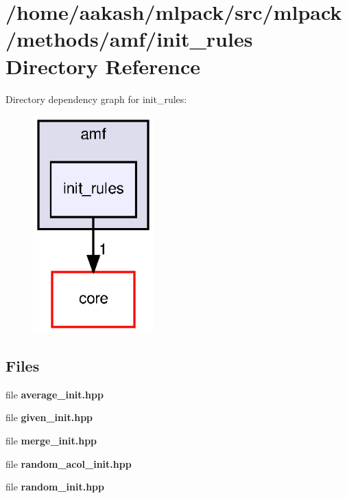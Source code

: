 \section{/home/aakash/mlpack/src/mlpack/methods/amf/init\+\_\+rules Directory Reference}
\label{dir_874bc73a472bc56857d75119e41021a1}
Directory dependency graph for init\+\_\+rules\+:
\nopagebreak
\begin{figure}[H]
\begin{center}
\leavevmode
\includegraphics[width=132pt]{dir_874bc73a472bc56857d75119e41021a1_dep}
\end{center}
\end{figure}
\subsection*{Files}
\begin{DoxyCompactItemize}
\item 
file \textbf{ average\+\_\+init.\+hpp}
\item 
file \textbf{ given\+\_\+init.\+hpp}
\item 
file \textbf{ merge\+\_\+init.\+hpp}
\item 
file \textbf{ random\+\_\+acol\+\_\+init.\+hpp}
\item 
file \textbf{ random\+\_\+init.\+hpp}
\end{DoxyCompactItemize}
